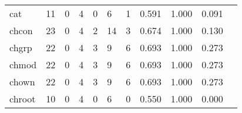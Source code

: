 \begin{longtable}{lp{1.2cm}p{1.2cm}p{1.2cm}p{1.2cm}p{1.2cm}p{1.2cm}p{1.2cm}p{1.2cm}p{1.2cm}p{1.2cm}}
cat       &                                    11 &                                                  0 &                                                  4 &                                                  0 &                                                  6 &                                                  1 &                                         0.591 &                                              1.000 &                                              0.091 \\
chcon     &                                    23 &                                                  0 &                                                  4 &                                                  2 &                                                 14 &                                                  3 &                                         0.674 &                                              1.000 &                                              0.130 \\
chgrp     &                                    22 &                                                  0 &                                                  4 &                                                  3 &                                                  9 &                                                  6 &                                         0.693 &                                              1.000 &                                              0.273 \\
chmod     &                                    22 &                                                  0 &                                                  4 &                                                  3 &                                                  9 &                                                  6 &                                         0.693 &                                              1.000 &                                              0.273 \\
chown     &                                    22 &                                                  0 &                                                  4 &                                                  3 &                                                  9 &                                                  6 &                                         0.693 &                                              1.000 &                                              0.273 \\
chroot    &                                    10 &                                                  0 &                                                  4 &                                                  0 &                                                  6 &                                                  0 &                                         0.550 &                                              1.000 &                                              0.000 \\

\end{longtable}
